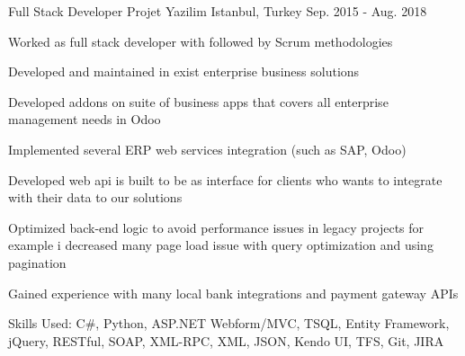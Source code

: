 \begin{cventries}
  \cventry
    {Full Stack Developer} %
    {Projet Yazilim} %
    {Istanbul, Turkey} %
    {Sep. 2015 - Aug. 2018} %
    {
      \begin{cvitems} %
        \item {Worked as full stack developer with followed by Scrum methodologies}
        \item {Developed and maintained in exist enterprise business solutions}
        \item {Developed addons on suite of business apps that covers all enterprise management needs in Odoo}
        \item {Implemented several ERP web services integration (such as SAP, Odoo)}
        \item {Developed web api is built to be as interface for clients who wants to integrate with their data to our solutions}
        \item {Optimized back-end logic to avoid performance issues in legacy projects for example i decreased many page load issue with query optimization and using pagination}
        \item {Gained experience with many local bank integrations and payment gateway APIs}
        \item {Skills Used: C\#, Python, ASP.NET Webform/MVC, TSQL, Entity Framework, jQuery, RESTful, SOAP, XML-RPC, XML, JSON, Kendo UI, TFS, Git, JIRA}
      \end{cvitems}
    }


\end{cventries}
